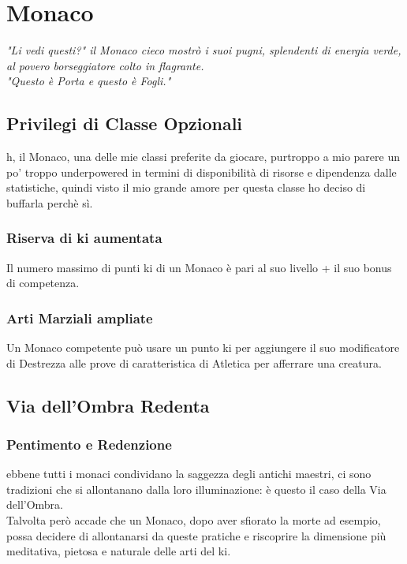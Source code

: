 \chapter{Monaco}

\begin{DndReadAloud}
  \it
  "Li vedi questi?" il Monaco cieco mostrò i suoi pugni, splendenti di energia verde, al povero borseggiatore colto in flagrante. \\ "Questo è Porta e questo è Fogli."
\end{DndReadAloud}

\section{Privilegi di Classe Opzionali}

h, il Monaco, una delle mie classi preferite da giocare, purtroppo a mio parere un po' troppo underpowered in termini di disponibilità di risorse e dipendenza dalle statistiche, quindi visto il mio grande amore per questa classe ho deciso di buffarla perchè sì.

\subsection{Riserva di ki aumentata}

Il numero massimo di punti ki di un Monaco è pari al suo livello + il suo bonus di competenza.

\subsection{Arti Marziali ampliate}

Un Monaco competente può usare un punto ki per aggiungere il suo modificatore di Destrezza alle prove di caratteristica di Atletica per afferrare una creatura.

\section{Via dell'Ombra Redenta}

\subsection{Pentimento e Redenzione}

ebbene tutti i monaci condividano la saggezza degli antichi maestri, ci sono tradizioni che si allontanano dalla loro illuminazione: è questo il caso della Via dell'Ombra. \\ Talvolta però accade che un Monaco, dopo aver sfiorato la morte ad esempio, possa decidere di allontanarsi da queste pratiche e riscoprire la dimensione più meditativa, pietosa e naturale delle arti del ki.

